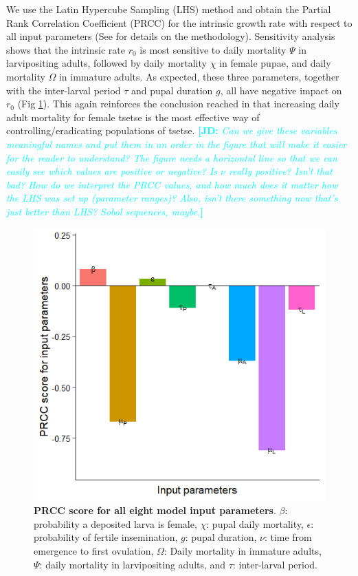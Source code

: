 \documentclass[12pt,a4paper]{article}
\newcommand{\comment}[3]{\textcolor{#1}{\textbf{[#2: }\textsl{#3}\textbf{]}}}
\newcommand{\jd}[1]{\comment{cyan}{JD}{#1}}
\begin{document}
We use the Latin Hypercube Sampling (LHS) method and obtain the Partial Rank Correlation Coefficient (PRCC) for the intrinsic growth rate with respect to all input parameters (See \cite{are2019weakest} for details on the methodology).  Sensitivity analysis shows that the intrinsic rate $r_0$ is most sensitive to daily mortality $\Psi$ in larvipositing adults, followed by daily mortality $\chi$ in female pupae, and daily mortality $\Omega$ in immature adults. As expected, these three parameters, together with the inter-larval period $\tau$ and pupal duration $g$, all have negative impact on $r_0$ (Fig \ref{fig:SensitivityPlot}). This again reinforces the conclusion reached in \cite{are2019weakest} that increasing daily adult mortality for female tsetse is the most effective way of controlling/eradicating populations of tsetse.  
\jd{Can we give these variables meaningful names and put them in an order in the figure that will make it easier for the reader to understand? The figure needs a horizontal line so that we can easily see which values are positive or negative? Is $\nu$ really positive? Isn't that bad? How do we interpret the PRCC values, and how much does it matter how the LHS was set up (parameter ranges)? Also, isn't there something now that's just better than LHS? Sobol sequences, maybe.}

\begin{figure}[hbt!]
	\centering
	\includegraphics[width=0.7\linewidth]{GrowthRateSensitivityPlot}
	\caption{{\bf PRCC score for all eight model input parameters}. $\beta$: probability a deposited larva is female, $\chi$: pupal daily mortality, $\epsilon$: probability of fertile insemination, $g$: pupal duration, $\nu$: time from emergence to first ovulation, $\Omega$: Daily mortality in immature adults, $\Psi$: daily mortality in larvipositing adults, and $\tau$: inter-larval period.}
	\label{fig:SensitivityPlot}
\end{figure}
\end{document}
